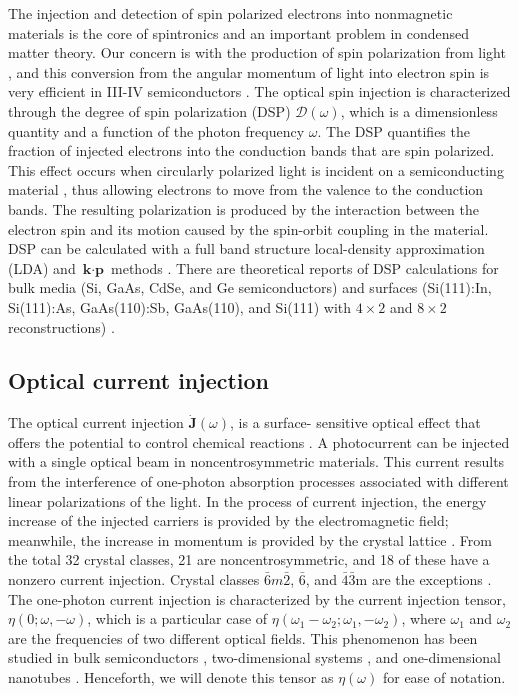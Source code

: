 \documentclass[pss]{wiley2sp} %
\begin{document}
The injection and detection of spin polarized electrons into nonmagnetic
materials is the core of spintronics \cite{vzuticRMP04,fertRMP08} and an
important  problem in condensed matter theory. Our concern is with the
production of spin polarization from light \cite{LampelPRL68}, and this
conversion from the angular momentum of light into electron spin is very
efficient in III-IV semiconductors \cite{dyakonovOO84}. The optical spin
injection is characterized through the degree of spin polarization (DSP)
$\mathcal{D}(\omega)$, which is a dimensionless quantity and a function of the
photon frequency $\omega$. The DSP quantifies the fraction of injected
electrons into the conduction bands that are spin polarized. This effect
occurs when circularly polarized light is incident on a semiconducting
material \cite{dyakonovOO84}, thus allowing electrons to move from the valence
to the conduction bands. The resulting polarization is produced by the
interaction between the electron spin and its motion caused by the spin-orbit
coupling in the material. DSP can be calculated with a full band structure
local-density approximation (LDA) and $\textbf{k}\cdot\textbf{p}$ methods
\cite{nastosPRB07,cabellosPRB09}. There are theoretical reports of DSP
calculations for bulk media (Si, GaAs, CdSe, and Ge semiconductors)
\cite{nastosPRB07,cabellosPRB09} and surfaces (Si(111):In, Si(111):As,
GaAs(110):Sb, GaAs(110), and Si(111) with $4\times2$ and $8\times2$
reconstructions) \cite{mendozaPRB12,arzatePRB14}.


\subsection{Optical current injection}

The optical current injection $\mathbf{\dot{J}}(\omega)$, is a surface-
sensitive optical effect that offers the potential to control chemical
reactions \cite{bhatPRB05,hachePRL97}. A photocurrent can be injected with a
single optical beam in noncentrosymmetric materials. This current results from
the interference of one-photon absorption processes associated with different
linear polarizations of the light. In the process of current injection, the
energy increase of the injected carriers is provided by the electromagnetic
field; meanwhile, the increase in momentum is provided by the crystal lattice
\cite{arzatePRB14}. From the total 32 crystal classes, 21 are
noncentrosymmetric, and 18 of these have a nonzero current injection. Crystal
classes $\bar{6}m\bar{2}$, $\bar{6}$, and $\bar{4}$$\bar{3}$m are the
exceptions \cite{sipePRB00}. The one-photon current injection is characterized
by the current injection tensor, $\eta(0;\omega,−\omega)$, which is a
particular case of $\eta(\omega_{1}-\omega_{2};\omega_{1},-\omega_{2})$, where
$\omega_{1}$ and $\omega_{2}$ are the frequencies of two different optical
fields. This phenomenon has been studied in bulk semiconductors
\cite{hachePRL97,sipePRB00}, two-dimensional systems
\cite{melePRB00,cabellosPRB11}, and one-dimensional nanotubes
\cite{melePRB00}. Henceforth, we will denote this tensor as $\eta(\omega)$ for 
ease of notation.
\end{document}
